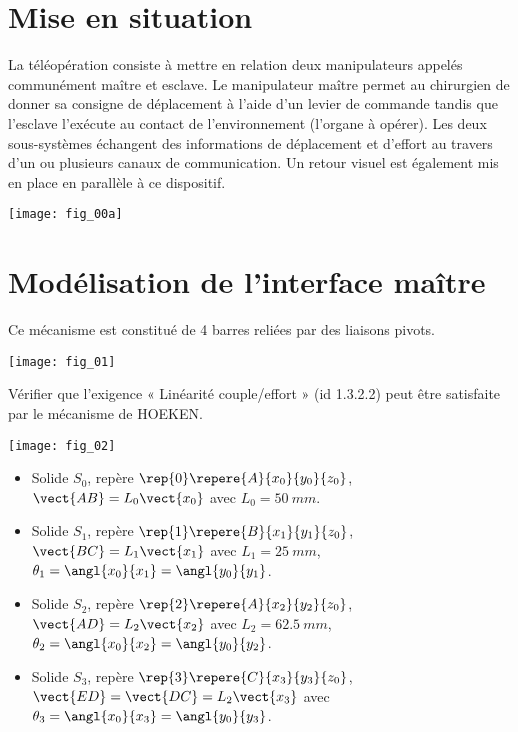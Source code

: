 \ifprof
\else
\begin{multicols}{2}
\fi


\section*{Mise en situation}
\ifprof
\else
La téléopération consiste à mettre en relation deux manipulateurs appelés communément
maître et esclave. Le manipulateur maître permet au chirurgien de donner sa consigne de
déplacement à l’aide d’un levier de commande tandis que l’esclave l’exécute au contact de
l’environnement (l’organe à opérer). Les deux sous-systèmes échangent des informations de
déplacement et d’effort au travers d’un ou plusieurs canaux de communication. Un retour
visuel est également mis en place en parallèle à ce dispositif.

\begin{center}
\texttt{[image: fig\_00a]}
\end{center}
\fi

\section*{Modélisation de l’interface maître}
\ifprof
\else

Ce mécanisme est constitué de 4 barres reliées par des liaisons pivots.

\begin{center}
\texttt{[image: fig\_01]}
\end{center}

\begin{obj}
Vérifier que l’exigence « Linéarité couple/effort » (id 1.3.2.2) peut être satisfaite
par le mécanisme de HOEKEN.
\end{obj}


\begin{center}
\texttt{[image: fig\_02]}
\end{center}

\begin{itemize}
\item Solide $S_0$, repère $\rep{0}\repere{A}{x_0}{y_0}{z_0}$, $\vect{AB}=L_0\vect{x_0}$ avec $L_0 = \SI{50}{mm}$.
\item Solide $S_1$, repère $\rep{1}\repere{B}{x_1}{y_1}{z_0}$, $\vect{BC}=L_1\vect{x_1}$ avec $L_1 = \SI{25}{mm}$, $\theta_1=\angl{x_0}{x_1}=\angl{y_0}{y_1}$.
\item Solide $S_2$, repère $\rep{2}\repere{A}{x_2}{y_2}{z_0}$, $\vect{AD}=L_2\vect{x_2}$ avec $L_2 = \SI{62,5}{mm}$, $\theta_2=\angl{x_0}{x_2}=\angl{y_0}{y_2}$.
\item Solide $S_3$, repère $\rep{3}\repere{C}{x_3}{y_3}{z_0}$, $\vect{ED}=\vect{DC}=L_2\vect{x_3}$ avec  $\theta_3=\angl{x_0}{x_3}=\angl{y_0}{y_3}$.
\end{itemize}



\end{multicols}
